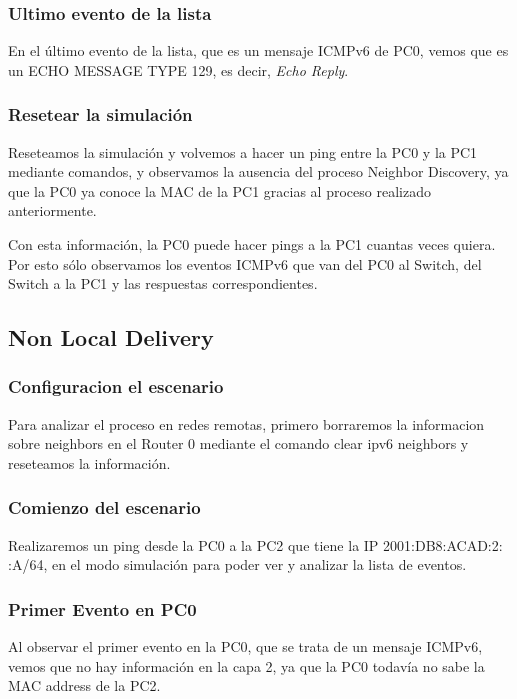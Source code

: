 \documentclass[a4paper,12pt]{article}
\begin{document}
\bigskip

\subsubsection{Ultimo evento de la lista}

En el último evento de la lista, que es un mensaje ICMPv6 de PC0, vemos que es un ECHO MESSAGE TYPE 129, es decir, \textit{Echo Reply}.

\bigskip

\subsubsection{Resetear la simulación}

Reseteamos la simulación y volvemos a hacer un ping entre la PC0 y la PC1 mediante comandos, y observamos la ausencia del proceso Neighbor Discovery, ya que la PC0 ya conoce la MAC de la PC1 gracias al proceso realizado anteriormente.

\bigskip


Con esta información, la PC0 puede hacer pings a la PC1 cuantas veces quiera. Por esto sólo observamos los eventos ICMPv6 que van del PC0 al Switch, del Switch a la PC1 y las respuestas correspondientes. 

\bigskip




\subsection{Non Local Delivery}

\subsubsection{Configuracion el escenario}
Para analizar el proceso en redes remotas, primero borraremos la informacion sobre neighbors en el Router 0 mediante el comando clear ipv6 neighbors y reseteamos la información.\\
\subsubsection{Comienzo del escenario}
Realizaremos un ping desde la PC0 a la PC2 que tiene la IP 2001:DB8:ACAD:2: :A/64, en el modo simulación para poder ver y analizar la lista de eventos.\\
\subsubsection{Primer Evento en PC0}
Al observar el primer evento en la PC0, que se trata de un mensaje ICMPv6, vemos que no hay información en la capa 2, ya que la PC0 todavía no sabe la MAC address de la PC2.\\
\end{document}
